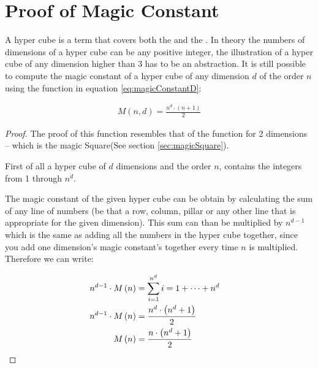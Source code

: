 \section{Proof of Magic Constant}
\label{sec:proofOfMagicConstant}
\begin{theorem}
	A hyper cube is a term that covers both the \msquare{} and the \mcube{}. In theory the numbers of dimensions of a hyper cube can be any positive integer, the illustration of a hyper cube of any dimension higher than 3 has to be an abstraction. It is still possible to compute the magic constant of a hyper cube of any dimension $d$ of the order $n$ using the function in equation \ref{eq:magicConstantD}:

	\begin{align}
	\label{eq:magicConstantD}
		M \left( n,d \right) = \frac{n^d \cdot \left( n+1 \right)}{2}
	\end{align}
\end{theorem}
\begin{proof}
	The proof of this function resembles that of the function for 2 dimensions -- which is the magic Square(See section \ref{sec:magicSquare}).
	
	First of all a hyper cube of $d$ dimensions and the order $n$, contains the integers from 1 through $n^d$.
	
	The magic constant of the given hyper cube can be obtain by calculating the sum of any line of numbers (be that a row, column, pillar or any other line that is appropriate for the given dimension). This sum can than be multiplied by $n^{d-1}$ which is the same as adding all the numbers in the hyper cube together, since you add one dimension's magic constant's together every time $n$ is multiplied. Therefore we can write:
	
	\begin{align*}
		n^{d-1} \cdot M \left( n \right) & = \sum ^{n^d}_{i = 1} i = 1 + \cdots + n^d \\
		n^{d-1} \cdot M \left( n \right) & = \frac{n^d \cdot \left( n^d + 1 \right)}{2} \\
		M \left( n \right) & = \frac{n \cdot \left( n^d + 1 \right)}{2} & \qedhere
	\end{align*}
\end{proof}
